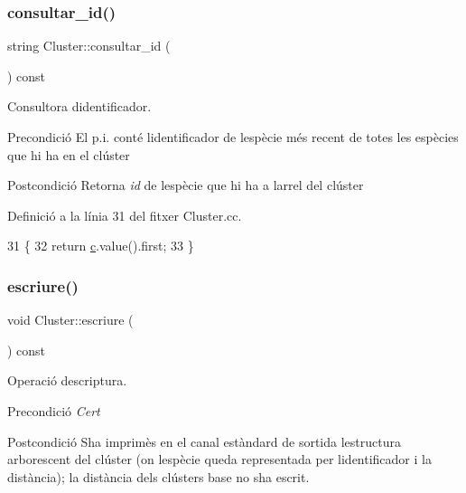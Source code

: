 \subsubsection{\texorpdfstring{consultar\+\_\+id()}{consultar\_id()}}
{\footnotesize\ttfamily string Cluster\+::consultar\+\_\+id (\begin{DoxyParamCaption}{ }\end{DoxyParamCaption}) const}



Consultora d\textquotesingle{}identificador. 

\begin{DoxyPrecond}{Precondició}
El p.\+i. conté l\textquotesingle{}identificador de l\textquotesingle{}espècie més recent de totes les espècies que hi ha en el clúster 
\end{DoxyPrecond}
\begin{DoxyPostcond}{Postcondició}
Retorna {\itshape id} de l\textquotesingle{}espècie que hi ha a l\textquotesingle{}arrel del clúster 
\end{DoxyPostcond}


Definició a la línia 31 del fitxer Cluster.\+cc.


\begin{DoxyCode}
31                                    \{
32     \textcolor{keywordflow}{return} \hyperlink{class_cluster_a1a623435b5ec16328059c9300fa0dfaa}{c}.value().first;
33 \}
\end{DoxyCode}
\mbox{\label{class_cluster_aae67c144fc543eace946dc8a651b5b7a}} 
\subsubsection{\texorpdfstring{escriure()}{escriure()}}
{\footnotesize\ttfamily void Cluster\+::escriure (\begin{DoxyParamCaption}{ }\end{DoxyParamCaption}) const}



Operació d\textquotesingle{}escriptura. 

\begin{DoxyPrecond}{Precondició}
{\itshape Cert} 
\end{DoxyPrecond}
\begin{DoxyPostcond}{Postcondició}
S\textquotesingle{}ha imprimès en el canal estàndard de sortida l\textquotesingle{}estructura arborescent del clúster (on l\textquotesingle{}espècie queda representada per l\textquotesingle{}identificador i la distància); la distància dels clústers base no s\textquotesingle{}ha escrit. 
\end{DoxyPostcond}


